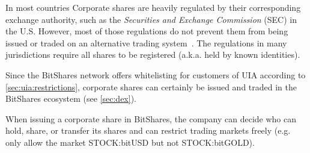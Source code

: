 In most countries Corporate shares are heavily regulated by their corresponding
exchange authority, such as the \emph{Securities and Exchange Commission} (SEC)
in the U.S. However, most of those regulations do not prevent them from being
issued or traded on an alternative trading system~\cite{altTrade}. The
regulations in many jurisdictions require all shares to be registered (a.k.a.
held by known identities). 

Since the BitShares network offers whitelisting for customers of UIA according
to \cref{sec:uia:restrictions}, corporate shares can certainly be issued and
traded in the BitShares ecosystem (see \cref{sec:dex}).

When issuing a corporate share in BitShares, the company can decide who can
hold, share, or transfer its shares and can restrict trading markets freely
(e.g. only allow the market STOCK:bitUSD but not STOCK:bitGOLD).

